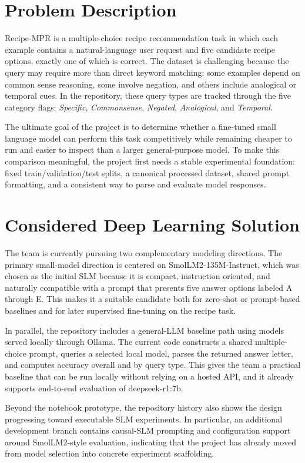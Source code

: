 \documentclass{article}
\begin{document}
\section{Problem Description}
Recipe-MPR is a multiple-choice recipe recommendation task in which each example contains a natural-language user request and five candidate recipe options, exactly one of which is correct. The dataset is challenging because the query may require more than direct keyword matching: some examples depend on common sense reasoning, some involve negation, and others include analogical or temporal cues. In the repository, these query types are tracked through the five category flags: \textit{Specific}, \textit{Commonsense}, \textit{Negated}, \textit{Analogical}, and \textit{Temporal}. 
 
The ultimate goal of the project is to determine whether a fine-tuned small language model can perform this task competitively while remaining cheaper to run and easier to inspect than a larger general-purpose model. To make this comparison meaningful, the project first needs a stable experimental foundation: fixed train/validation/test splits, a canonical processed dataset, shared prompt formatting, and a consistent way to parse and evaluate model responses.
%
%
%
%
%
%
\section{Considered Deep Learning Solution}
The team is currently pursuing two complementary modeling directions. The primary small-model direction is centered on SmolLM2-135M-Instruct, which was chosen as the initial SLM because it is compact, instruction oriented, and naturally compatible with a prompt that presents five answer options labeled A through E. This makes it a suitable candidate both for zero-shot or prompt-based baselines and for later supervised fine-tuning on the recipe task.

In parallel, the repository includes a general-LLM baseline path using models served locally through Ollama. The current code constructs a shared multiple-choice prompt, queries a selected local model, parses the returned answer letter, and computes accuracy overall and by query type. This gives the team a practical baseline that can be run locally without relying on a hosted API, and it already supports end-to-end evaluation of deepseek-r1:7b.

Beyond the notebook prototype, the repository history also shows the design progressing toward executable SLM experiments. In particular, an additional development branch contains causal-SLM prompting and configuration support around SmolLM2-style evaluation, indicating that the project has already moved from model selection into concrete experiment scaffolding.
%
%
%
%
%
%
\end{document}
